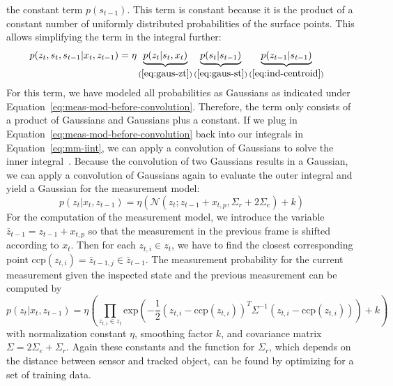 \documentclass[twoside,a4paper,article]{combine}
\begin{document}
the constant term $p(s_{t-1})$. This term is constant because it is
the product of a constant number of uniformly distributed
probabilities of the surface points. This allows simplifying the
term in the integral further:
\begin{align}
\label{eq:meas-mod-before-convolution}
p(z_t,s_t,s_{t-1}|x_t,z_{t-1})
&=\eta\underbrace{p(z_t|s_t,x_t)}_{(\ref{eq:gaus-zt})}\underbrace{p(s_t|s_{t-1})}_{(\ref{eq:gaus-st})}\underbrace{p(z_{t-1}|s_{t-1})}_{(\ref{eq:ind-centroid})}
\end{align}
For this term, we have modeled all probabilities as Gaussians as
indicated under Equation~\ref{eq:meas-mod-before-convolution}.
Therefore, the term only consists of a product of Gaussians and
Gaussians plus a constant. If we plug in
Equation~\ref{eq:meas-mod-before-convolution} back into our integrals
in Equation~\ref{eq:mm-iint}, we can apply a convolution of Gaussians
to solve the inner integral~\cite{prob-rob}. Because the convolution of two Gaussians
results in a Gaussian, we can apply a convolution of Gaussians again
to evaluate the outer integral and yield a Gaussian for the
measurement model:
\begin{equation}
\label{eq:gaus-mm}
p(z_t|x_t,z_{t-1}) =
\eta(\mathcal{N}(z_t;z_{t-1}+x_{t,p},\Sigma_r+2\Sigma_e)+k)
\end{equation}
For the computation of the measurement model, we introduce the
variable $\bar{z}_{t-1}=z_{t-1}+x_{t,p}$ so that the measurement in
the previous frame is shifted according to $x_t$. Then for each
$z_{t,i}\in z_t$, we have to find the closest corresponding point
$\mathrm{ccp}(z_{t,i}) = \bar{z}_{t-1,j}\in \bar{z}_{t-1}$. The measurement
probability for the current measurement given the inspected state and
the previous measurement can be computed by
\begin{equation}
\label{eq:mm-compute}
p(z_t|x_t,z_{t-1}) =
\eta\left(\prod_{z_{t,i}\in z_t}
\mathrm{exp}\left(-\frac{1}{2}(z_{t,i}-\mathrm{ccp}(z_{t,i}))^T\Sigma^{-1}(z_{t,i}-\mathrm{ccp}(z_{t,i}))\right)+k\right)
\end{equation}
with normalization constant $\eta$, smoothing factor $k$, and
covariance matrix $\Sigma = 2\Sigma_e+\Sigma_r$. Again these constants
and the function for $\Sigma_r$, which depends on the distance between
sensor and tracked object, can be found by optimizing for a set of
training data.
\end{document}
